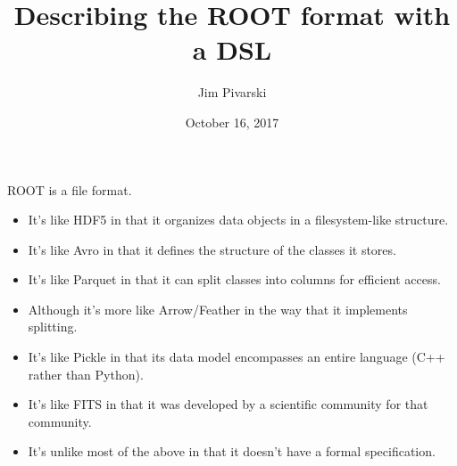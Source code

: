 \documentclass[aspectratio=169]{beamer}
\title[2017-10-16-diana-rootspec]{Describing the ROOT format with a DSL}
\author{Jim Pivarski}
\institute{Princeton University -- DIANA}
\date{October 16, 2017}
\begin{document}

\begin{frame}
  \titlepage
\end{frame}




\begin{frame}{}
\vspace{0.75 cm}
\begin{center}
\large ROOT is a file format.
\end{center}

\begin{itemize}\setlength{\itemsep}{0.2 cm}
\item It's like HDF5 in that it organizes data objects in a filesystem-like structure.
\item It's like Avro in that it defines the structure of the classes it stores.
\item It's like Parquet in that it can split classes into columns for efficient access.
\item Although it's more like Arrow/Feather in the way that it implements splitting.
\item It's like Pickle in that its data model encompasses an entire language (C++ rather than Python).
\item It's like FITS in that it was developed by a scientific community for that community.
\item It's unlike most of the above in that it doesn't have a formal specification.
\end{itemize}
\end{frame}
\end{document}
